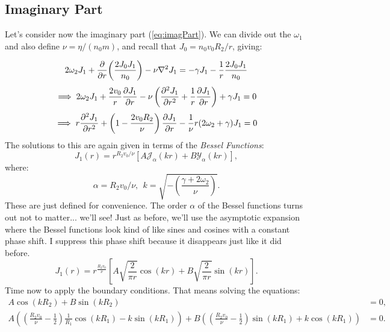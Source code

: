 \documentclass[12pt]{article}
\begin{document}
 	\subsection{Imaginary Part}
 	Let's consider now the imaginary part (\ref{eq:imagPart}).  We can divide out the $\omega_1$ and also define $\nu = \eta/(n_0 m)$, and recall that $J_0 = n_0 v_0 R_2 / r$, giving:
 	
 	\[ 2\omega_2J_1 + \pdv{r}(\frac{2J_0J_1}{n_0}) - \nu \laplacian{J_1} = -\gamma J_1 - \frac{1}{r} \frac{2J_0J_1}{n_0} \]
 	\[ \implies 2\omega_2 J_1 + \frac{2 v_0}{r}\pdv{J_1}{r}  - \nu \left( \pdv[2]{J_1}{r} + \frac{1}{r}\pdv{J_1}{r}\right) + \gamma J_1 = 0 \]
 	\begin{equation}
 	\label{eq:imagEquation}
 	\implies r\pdv[2]{J_1}{r} + \left(1 - \frac{2v_0R_2}{\nu}\right)\pdv{J_1}{r} - \frac{1}{\nu}r(2\omega_2 + \gamma)J_1=0
 	\end{equation}
 	The solutions to this are again given in terms of the \textit{Bessel Functions}:
 	\begin{equation}
 	J_1(r) = r^{R_2v_0/\nu} \left[ A \mathcal{J}_\alpha \left( kr \right) + B \mathcal{Y}_\alpha \left( kr \right) \right],
 	\end{equation}
 	where:
 	\begin{equation}
 	\alpha = R_2v_0/\nu,\ \  k = \sqrt{-\left( \frac{\gamma + 2\omega_2}{\nu} \right)}.
 	\end{equation}
 	These are just defined for convenience. The order $\alpha$ of the Bessel functions turns out not to matter... we'll see!  Just as before, we'll use the asymptotic expansion where the Bessel functions look kind of like sines and cosines with a constant phase shift.  I suppress this phase shift because it disappears just like it did before.
 	\begin{equation}
 	J_1(r) = r^{\frac{R_2v_0}{\nu}} \left[ A\sqrt{\frac{2}{\pi r}}\cos(kr) + B\sqrt{\frac{2}{\pi r}}\sin(kr) \right].
 	\end{equation}
 	Time now to apply the boundary conditions.  That means solving the equations:
 	\begin{equation}
 	\begin{aligned}
 		A\cos(kR_2) + B\sin(kR_2) &= 0, \\
 		A \left( \left( \frac{R_2v_0}{\nu} - \frac{1}{2} \right)\frac{1}{R_1}\cos(kR_1) - k \sin(kR_1) \right) + B \left( \left(\frac{R_2v_0}{\nu} - \frac{1}{2} \right)\sin(kR_1) + k \cos(kR_1) \right) &= 0.
 	\end{aligned}
 	\end{equation}
\end{document}
